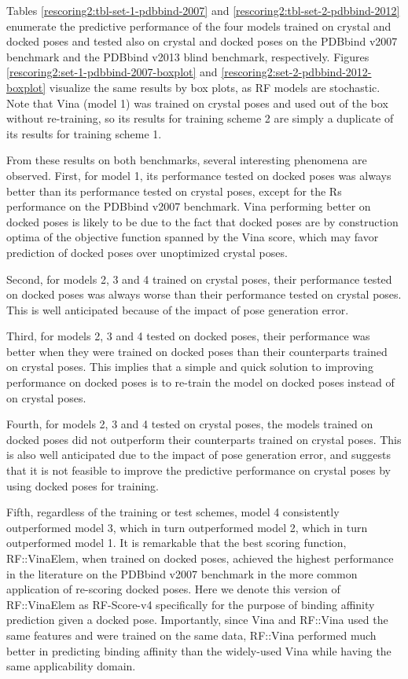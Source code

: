 \documentclass[twocolumn]{bmcart}
\begin{document}
Tables \ref{rescoring2:tbl-set-1-pdbbind-2007} and \ref{rescoring2:tbl-set-2-pdbbind-2012} enumerate the predictive performance of the four models trained on crystal and docked poses and tested also on crystal and docked poses on the PDBbind v2007 benchmark and the PDBbind v2013 blind benchmark, respectively. Figures \ref{rescoring2:set-1-pdbbind-2007-boxplot} and \ref{rescoring2:set-2-pdbbind-2012-boxplot} visualize the same results by box plots, as RF models are stochastic. Note that Vina (model 1) was trained on crystal poses and used out of the box without re-training, so its results for training scheme 2 are simply a duplicate of its results for training scheme 1.

From these results on both benchmarks, several interesting phenomena are observed. First, for model 1, its performance tested on docked poses was always better than its performance tested on crystal poses, except for the Rs performance on the PDBbind v2007 benchmark. Vina performing better on docked poses is likely to be due to the fact that docked poses are by construction optima of the objective function spanned by the Vina score, which may favor prediction of docked poses over unoptimized crystal poses.

Second, for models 2, 3 and 4 trained on crystal poses, their performance tested on docked poses was always worse than their performance tested on crystal poses. This is well anticipated because of the impact of pose generation error.

Third, for models 2, 3 and 4 tested on docked poses, their performance was better when they were trained on docked poses than their counterparts trained on crystal poses. This implies that a simple and quick solution to improving performance on docked poses is to re-train the model on docked poses instead of on crystal poses.

Fourth, for models 2, 3 and 4 tested on crystal poses, the models trained on docked poses did not outperform their counterparts trained on crystal poses. This is also well anticipated due to the impact of pose generation error, and suggests that it is not feasible to improve the predictive performance on crystal poses by using docked poses for training.

Fifth, regardless of the training or test schemes, model 4 consistently outperformed model 3, which in turn outperformed model 2, which in turn outperformed model 1. It is remarkable that the best scoring function, RF::VinaElem, when trained on docked poses, achieved the highest performance in the literature on the PDBbind v2007 benchmark in the more common application of re-scoring docked poses. Here we denote this version of RF::VinaElem as RF-Score-v4 specifically for the purpose of binding affinity prediction given a docked pose. Importantly, since Vina and RF::Vina used the same features and were trained on the same data, RF::Vina performed much better in predicting binding affinity than the widely-used Vina while having the same applicability domain.
\end{document}
